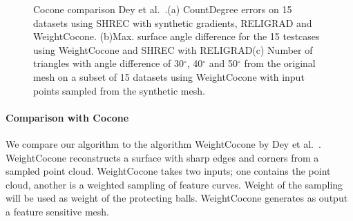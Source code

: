 \begin{figure}[t]
	\centering
		\caption{Cocone comparison Dey et al.~\cite{Dey2012,Dey2013}.(a) CountDegree errors on 15 datasets using SHREC with synthetic gradients, RELIGRAD and WeightCocone. (b)Max. surface angle difference for the 15 testcases using WeightCocone and SHREC with RELIGRAD(c) Number of triangles with angle difference of 30$^\circ$, 40$^\circ$ and 50$^\circ$ from the original mesh on a subset of 15 datasets using WeightCocone with  input points sampled from the synthetic mesh.}
		\label{fig:cocone:compare}
\end{figure}

\paragraph{Comparison with Cocone}
We compare our algorithm to the algorithm WeightCocone by Dey et al.~\cite{Dey2012}. WeightCocone reconstructs a surface with sharp edges and corners from a sampled point cloud. WeightCocone takes two inputs; one contains the point cloud, another is a weighted sampling of feature curves. Weight of the sampling will be used as weight of the protecting balls. WeightCocone generates as output a feature sensitive mesh. 

